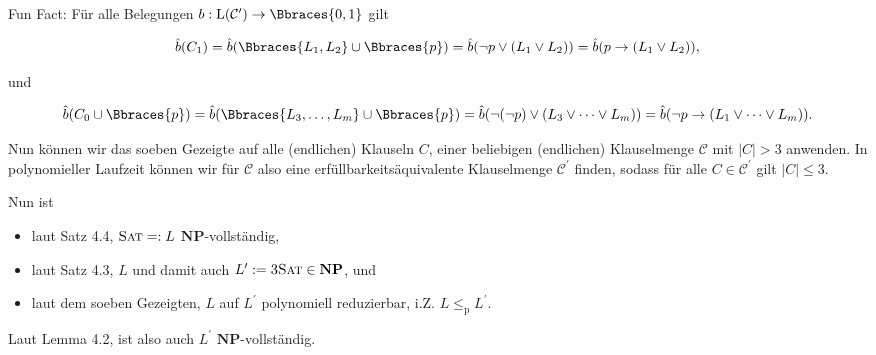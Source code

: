 \begin{solution}
Fun Fact:
Für alle Belegungen $b: \operatorname L(\mathcal C^\prime) \to \Bbraces{0, 1}$ gilt

\begin{align*}
    \hat b(C_1)
    =
    \hat b(\Bbraces{L_1, L_2} \cup \Bbraces{p})
    =
    \hat b(\neg p \lor (L_1 \lor L_2))
    =
    \hat b(p \to (L_1 \lor L_2)),
\end{align*}

und

\begin{align*}
    \hat b(C_0 \cup \Bbraces{p})
    =
    \hat b(\Bbraces{L_3, \dots, L_m} \cup \Bbraces{p})
    =
    \hat b(\neg (\neg p) \lor (L_3 \lor \dots \lor L_m))
    =
    \hat b(\neg p \to (L_1 \lor \dots \lor L_m)).
\end{align*}

Nun können wir das soeben Gezeigte auf alle (endlichen) Klauseln $C$, einer beliebigen (endlichen) Klauselmenge $\mathcal C$ mit $|C| > 3$ anwenden.
In polynomieller Laufzeit können wir für $\mathcal C$ also eine erfüllbarkeitsäquivalente Klauselmenge $\mathcal C^\prime$ finden, sodass für alle $C \in \mathcal C^\prime$ gilt $|C| \leq 3$.

Nun ist

\begin{itemize}
    \item laut Satz 4.4, $\textsc{Sat} =: L$ $\mathbf{NP}$-vollständig,
    \item laut Satz 4.3, $L$ und damit auch $L^\prime := \textsc{3Sat} \in \mathbf{NP}$, und
    \item laut dem soeben Gezeigten, $L$ auf $L^\prime$ polynomiell reduzierbar, i.Z. $L \leq_\mathrm{p} L^\prime$.
\end{itemize}

Laut Lemma 4.2, ist also auch $L^\prime$ $\mathbf{NP}$-vollständig.

\end{solution}

